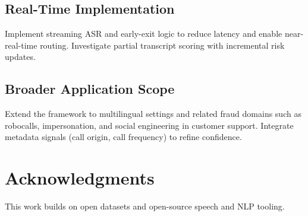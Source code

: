 \documentclass[11pt,a4paper]{article}
\begin{document}
\subsection{Real-Time Implementation}
Implement streaming ASR and early-exit logic to reduce latency and enable near-real-time routing. Investigate partial transcript scoring with incremental risk updates.

\subsection{Broader Application Scope}
Extend the framework to multilingual settings and related fraud domains such as robocalls, impersonation, and social engineering in customer support. Integrate metadata signals (call origin, call frequency) to refine confidence.

\section*{Acknowledgments}
This work builds on open datasets and open-source speech and NLP tooling.



\end{document}
